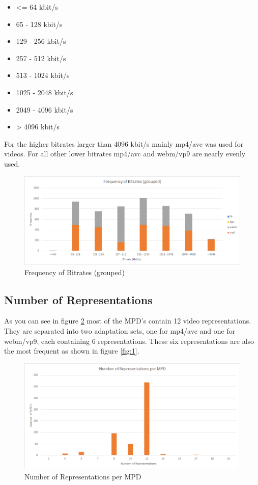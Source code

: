 \documentclass[paper=a4, fontsize=11pt]{scrartcl} %
\providecommand{\tightlist}{%
  \setlength{\itemsep}{0pt}\setlength{\parskip}{0pt}}
\numberwithin{equation}{section} %
\numberwithin{figure}{section} %
\numberwithin{table}{section} %
\begin{document}
\begin{itemize}
\tightlist
\item
  \textless{}= 64 kbit/s
\item
  65 - 128 kbit/s
\item
  129 - 256 kbit/s
\item
  257 - 512 kbit/s
\item
  513 - 1024 kbit/s
\item
  1025 - 2048 kbit/s
\item
  2049 - 4096 kbit/s
\item
  \textgreater{} 4096 kbit/s
\end{itemize}

For the higher bitrates larger than 4096 kbit/s mainly mp4/avc was used
for videos. For all other lower bitrates mp4/avc and webm/vp9 are nearly
evenly used.

\begin{figure}[htbp]
\centering
\includegraphics[width=\textwidth]{./frequency-bitrate-cleaned.png}
\caption{Frequency of Bitrates (grouped)}
\label{fig:2}
\end{figure}

\subsection{Number of Representations}

As you can see in figure \ref{fig:3} most of the MPD's contain 12 video representations. They are separated
into two adaptation sets, one for mp4/avc and one for webm/vp9, each containing 6 representations. These
six representations are also the most frequent as shown in figure \ref{fig:1}.

\begin{figure}[htbp]
\centering
\includegraphics[width=\textwidth]{./number-representations.png}
\caption{Number of Representations per MPD}
\label{fig:3}
\end{figure}
\end{document}
